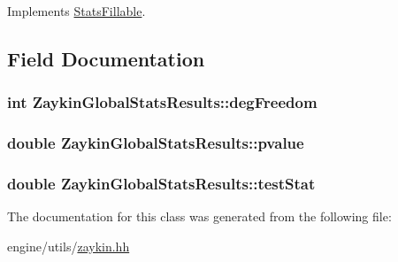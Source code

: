Implements \hyperlink{classStatsFillable_a6bc1a66ea949a078faa1b9ccdac54aba}{StatsFillable}.



\subsection{Field Documentation}
\hypertarget{classZaykinGlobalStatsResults_a4a9280a8dc6ea691eaadca1ae5438663}{
\subsubsection[{degFreedom}]{\setlength{\rightskip}{0pt plus 5cm}int {\bf ZaykinGlobalStatsResults::degFreedom}}}
\label{classZaykinGlobalStatsResults_a4a9280a8dc6ea691eaadca1ae5438663}
\hypertarget{classZaykinGlobalStatsResults_ab8725b9e186651f5d41be92b4947152b}{
\subsubsection[{pvalue}]{\setlength{\rightskip}{0pt plus 5cm}double {\bf ZaykinGlobalStatsResults::pvalue}}}
\label{classZaykinGlobalStatsResults_ab8725b9e186651f5d41be92b4947152b}
\hypertarget{classZaykinGlobalStatsResults_aaedd2cf27b9e362ff177dd01a2809192}{
\subsubsection[{testStat}]{\setlength{\rightskip}{0pt plus 5cm}double {\bf ZaykinGlobalStatsResults::testStat}}}
\label{classZaykinGlobalStatsResults_aaedd2cf27b9e362ff177dd01a2809192}


The documentation for this class was generated from the following file:\begin{DoxyCompactItemize}
\item 
engine/utils/\hyperlink{zaykin_8hh}{zaykin.hh}\end{DoxyCompactItemize}
